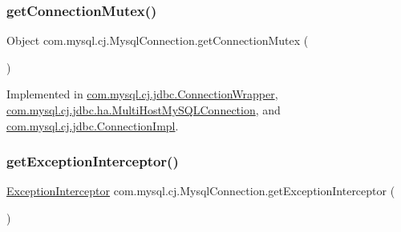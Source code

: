 \mbox{\label{interfacecom_1_1mysql_1_1cj_1_1_mysql_connection_a9509cf17d31eff921de41b8ecd03278f}} 
\subsubsection{\texorpdfstring{get\+Connection\+Mutex()}{getConnectionMutex()}}
{\footnotesize\ttfamily Object com.\+mysql.\+cj.\+Mysql\+Connection.\+get\+Connection\+Mutex (\begin{DoxyParamCaption}{ }\end{DoxyParamCaption})}



Implemented in \mbox{\hyperlink{classcom_1_1mysql_1_1cj_1_1jdbc_1_1_connection_wrapper_a6542c75a7fef46e1f62e68a00c01d211}{com.\+mysql.\+cj.\+jdbc.\+Connection\+Wrapper}}, \mbox{\hyperlink{classcom_1_1mysql_1_1cj_1_1jdbc_1_1ha_1_1_multi_host_my_s_q_l_connection_a06d09fc5eed4ef3d1142e26491b25ea4}{com.\+mysql.\+cj.\+jdbc.\+ha.\+Multi\+Host\+My\+S\+Q\+L\+Connection}}, and \mbox{\hyperlink{classcom_1_1mysql_1_1cj_1_1jdbc_1_1_connection_impl_a2d5f7dcbb793d20fce3c805a2ad96b80}{com.\+mysql.\+cj.\+jdbc.\+Connection\+Impl}}.

\mbox{\label{interfacecom_1_1mysql_1_1cj_1_1_mysql_connection_a90d92a3170923d8e05d748f2079dca15}} 
\subsubsection{\texorpdfstring{get\+Exception\+Interceptor()}{getExceptionInterceptor()}}
{\footnotesize\ttfamily \mbox{\hyperlink{interfacecom_1_1mysql_1_1cj_1_1exceptions_1_1_exception_interceptor}{Exception\+Interceptor}} com.\+mysql.\+cj.\+Mysql\+Connection.\+get\+Exception\+Interceptor (\begin{DoxyParamCaption}{ }\end{DoxyParamCaption})}



